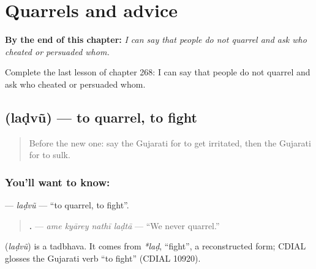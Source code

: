 
\chapter{Quarrels and advice}
\label{ch:gu-quarrels-and-advice}

\begin{chapteropening}
\textbf{By the end of this chapter:} \emph{I can say that people do not quarrel and ask who cheated or persuaded whom.}

Complete the last lesson of chapter 268: I can say that people do not quarrel and ask who cheated or persuaded whom.
\end{chapteropening}

\section[\texorpdfstring{\gu{લડવું} (laḍvũ)}{લડવું (laḍvũ)}]{ (laḍvũ) — to quarrel, to fight}

\label{lesson:GU-C268-ladvu-fight}



\begin{quote}
Before the new one: say the Gujarati for to get irritated, then the Gujarati for to sulk.
\end{quote}

\subsection*{You'll want to know: }
\textbf{} — \emph{laḍvũ} — \textquotedblleft{}to quarrel, to fight\textquotedblright{}.

\begin{quote}
\textbf{   .} — \emph{ame kyārey nathī laḍtā} — \textquotedblleft{}We never quarrel.\textquotedblright{}
\end{quote}

\begin{cousinweb}
\textbf{} (\emph{laḍvũ}) is a tadbhava. It comes from \emph{*laḍ}, \textquotedblleft{}fight\textquotedblright{}, a reconstructed form; CDIAL glosses the Gujarati verb \textquotedblleft{}to fight\textquotedblright{} (CDIAL 10920).
\end{cousinweb}

